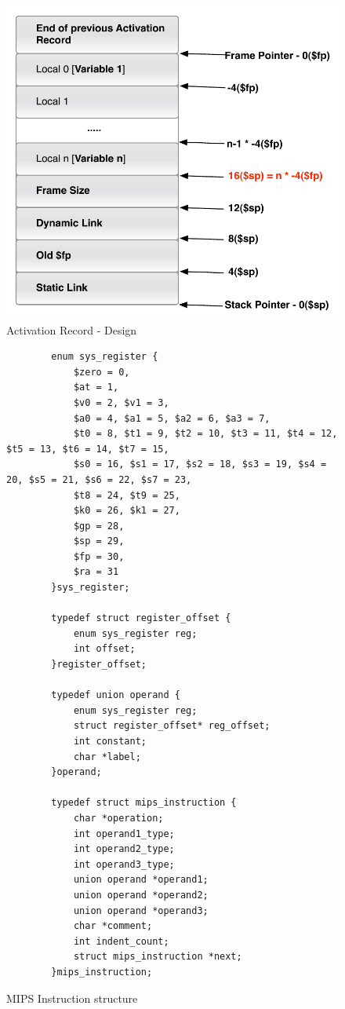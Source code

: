 \begin{figure}[p]
	\includegraphics[scale=0.6]{ar-include.pdf}
	\caption{Activation Record - Design}
	\label{fig:AR}
\end{figure}

\begin{figure}[p]
	\begin{verbatim}
		enum sys_register {
		    $zero = 0, 
		    $at = 1,	
		    $v0 = 2, $v1 = 3,
		    $a0 = 4, $a1 = 5, $a2 = 6, $a3 = 7,
		    $t0 = 8, $t1 = 9, $t2 = 10, $t3 = 11, $t4 = 12, $t5 = 13, $t6 = 14,	$t7 = 15,					
		    $s0 = 16, $s1 = 17, $s2 = 18, $s3 = 19, $s4 = 20, $s5 = 21, $s6 = 22, $s7 = 23,
		    $t8 = 24, $t9 = 25,
		    $k0 = 26, $k1 = 27,
		    $gp = 28,
		    $sp = 29,
		    $fp = 30,
		    $ra = 31				
		}sys_register;

		typedef struct register_offset {
		    enum sys_register reg;
		    int offset;
		}register_offset;

		typedef union operand {
		    enum sys_register reg;
		    struct register_offset* reg_offset;
		    int constant;
		    char *label;
		}operand;
		
		typedef struct mips_instruction {
		    char *operation;
		    int operand1_type;
		    int operand2_type;
		    int operand3_type;
		    union operand *operand1;
		    union operand *operand2;
		    union operand *operand3;		
		    char *comment;
		    int indent_count;
		    struct mips_instruction *next;
		}mips_instruction;
	\end{verbatim}
	\caption{MIPS Instruction structure}
	\label{fig:mipsinstr}
\end{figure}